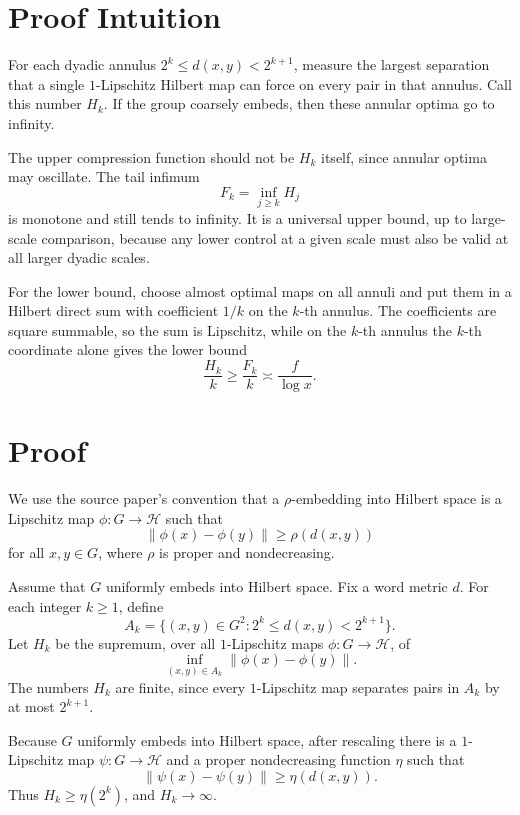 \documentclass[11pt]{article}
\newcommand{\Hilb}{\mathcal H}
\begin{document}
\section*{Proof Intuition}

For each dyadic annulus \(2^k\le d(x,y)<2^{k+1}\), measure the largest
separation that a single \(1\)-Lipschitz Hilbert map can force on every pair
in that annulus.  Call this number \(H_k\).  If the group coarsely embeds,
then these annular optima go to infinity.

The upper compression function should not be \(H_k\) itself, since annular
optima may oscillate.  The tail infimum
\[
        F_k=\inf_{j\ge k} H_j
\]
is monotone and still tends to infinity.  It is a universal upper bound, up to
large-scale comparison, because any lower control at a given scale must also
be valid at all larger dyadic scales.

For the lower bound, choose almost optimal maps on all annuli and put them in
a Hilbert direct sum with coefficient \(1/k\) on the \(k\)-th annulus.  The
coefficients are square summable, so the sum is Lipschitz, while on the
\(k\)-th annulus the \(k\)-th coordinate alone gives the lower bound
\[
        \frac{H_k}{k}\ge \frac{F_k}{k}\asymp \frac{f}{\log x}.
\]

\section*{Proof}

We use the source paper's convention that a \(\rho\)-embedding into Hilbert
space is a Lipschitz map \(\phi:G\to\Hilb\) such that
\[
        \|\phi(x)-\phi(y)\|\ge \rho(d(x,y))
\]
for all \(x,y\in G\), where \(\rho\) is proper and nondecreasing.

Assume that \(G\) uniformly embeds into Hilbert space.  Fix a word
metric \(d\).  For each integer \(k\ge1\), define
\[
 A_k=\{(x,y)\in G^2:2^k\le d(x,y)<2^{k+1}\}.
\]
Let \(H_k\) be the supremum, over all \(1\)-Lipschitz maps
\(\phi:G\to\Hilb\), of
\[
        \inf_{(x,y)\in A_k}\|\phi(x)-\phi(y)\|.
\]
The numbers \(H_k\) are finite, since every \(1\)-Lipschitz map separates
pairs in \(A_k\) by at most \(2^{k+1}\).

Because \(G\) uniformly embeds into Hilbert space, after rescaling there is a
\(1\)-Lipschitz map \(\psi:G\to\Hilb\) and a proper nondecreasing function
\(\eta\) such that
\[
        \|\psi(x)-\psi(y)\|\ge \eta(d(x,y)).
\]
Thus \(H_k\ge \eta(2^k)\), and \(H_k\to\infty\).
\end{document}
